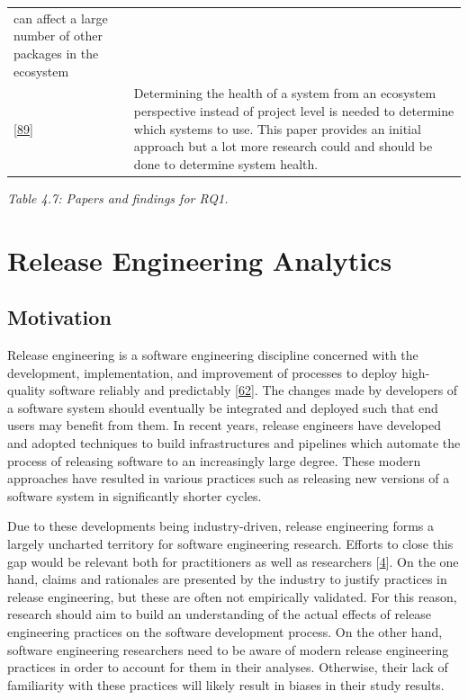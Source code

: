 \documentclass[]{book}
\begin{document}
\begin{longtable}[]{@{}ll@{}}
\begin{minipage}[t]{0.29\columnwidth}
can affect a large number of other packages in the ecosystem\strut
\end{minipage}\tabularnewline
\begin{minipage}[t]{0.13\columnwidth}\raggedright\strut
{[}\protect\hyperlink{ref-Jansen2014}{89}{]}\strut
\end{minipage} & \begin{minipage}[t]{0.29\columnwidth}\raggedright\strut
Determining the health of a system from an ecosystem perspective instead
of project level is needed to determine which systems to use. This paper
provides an initial approach but a lot more research could and should be
done to determine system health.\strut
\end{minipage}\tabularnewline
\bottomrule
\end{longtable}

\emph{Table 4.7: Papers and findings for RQ1.}

\chapter{Release Engineering
Analytics}\label{release-engineering-analytics}

\section{Motivation}\label{motivation-4}

Release engineering is a software engineering discipline concerned with
the development, implementation, and improvement of processes to deploy
high-quality software reliably and predictably
{[}\protect\hyperlink{ref-dyck2015a}{62}{]}. The changes made by
developers of a software system should eventually be integrated and
deployed such that end users may benefit from them. In recent years,
release engineers have developed and adopted techniques to build
infrastructures and pipelines which automate the process of releasing
software to an increasingly large degree. These modern approaches have
resulted in various practices such as releasing new versions of a
software system in significantly shorter cycles.

Due to these developments being industry-driven, release engineering
forms a largely uncharted territory for software engineering research.
Efforts to close this gap would be relevant both for practitioners as
well as researchers {[}\protect\hyperlink{ref-adams2016a}{4}{]}. On the
one hand, claims and rationales are presented by the industry to justify
practices in release engineering, but these are often not empirically
validated. For this reason, research should aim to build an
understanding of the actual effects of release engineering practices on
the software development process. On the other hand, software
engineering researchers need to be aware of modern release engineering
practices in order to account for them in their analyses. Otherwise,
their lack of familiarity with these practices will likely result in
biases in their study results.
\end{document}
